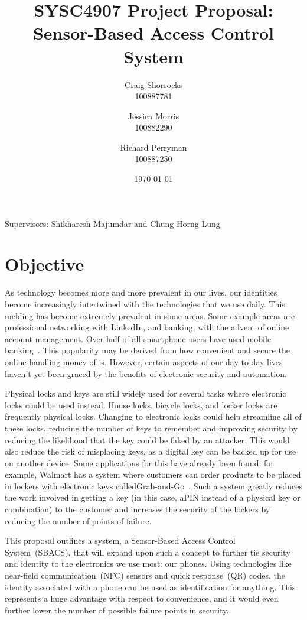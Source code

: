 \documentclass{article}
\title{SYSC4907 Project Proposal: \\ Sensor-Based Access Control System}
\author{
	Craig Shorrocks \\
	100887781
	\and
	Jessica Morris \\
	100882290
	\and
	Richard Perryman \\
	100887250
}
\date{\today}
\begin{document}
\maketitle

\begin{center}
Supervisors: Shikharesh Majumdar and Chung-Horng Lung
\end{center}

\pagebreak

\tableofcontents

\pagebreak

\section{Objective}

As technology becomes more and more prevalent in our lives, our identities become increasingly intertwined with the
technologies that we use daily. This melding has become extremely prevalent in some areas. Some example areas are
professional networking with LinkedIn, and banking, with the advent of online account management. Over half of all
smartphone users have used mobile banking~\autocite{MOBILEBANKING}. This popularity may be derived
from how convenient and secure the online handling money of is. However, certain aspects of our day to day lives
haven't yet been graced by the benefits of electronic security and automation.

Physical locks and keys are still widely used for several tasks where electronic locks could be used instead. House
locks, bicycle locks, and locker locks are frequently physical locks. Changing to electronic locks could help streamline
all of these locks, reducing the number of keys to remember and improving security by reducing the likelihood that the
key could be faked by an attacker. This would also reduce the risk of misplacing keys, as a digital key can be backed 
up for use on another device. Some applications for this have already been found: for example, Walmart has a system 
where customers can order products to be placed in lockers with electronic keys calledGrab-and-Go~\autocite{WALMART}. 
Such a system greatly reduces the work involved in getting a key (in this case, aPIN instead of a physical key or 
combination) to the customer and increases the security of the lockers by reducing the number of points of failure.

This proposal outlines a system, a Sensor-Based Access Control System~(SBACS), that will expand upon such a concept to 
further tie security and identity to the electronics we use most: our phones. Using technologies like near-field 
communication~(NFC) sensors and quick response~(QR) codes, the identity associated with a phone can be used as 
identification for anything. This represents a huge advantage with respect to convenience, and it would even further 
lower the number of possible failure points in security.
\end{document}
